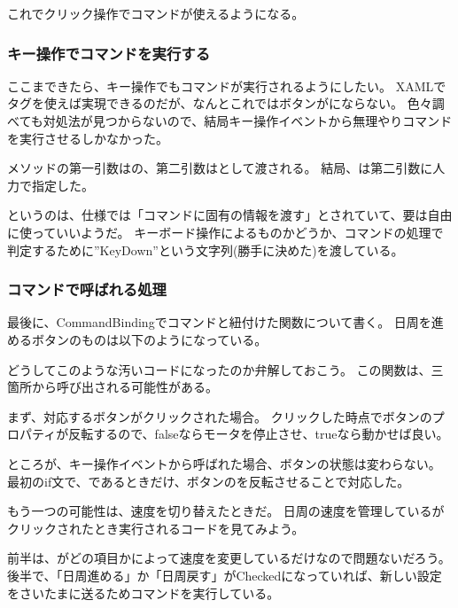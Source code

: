 \documentclass[letterpaper,10pt,dvipdfmx]{sphinxmanual}
\begin{document}
これでクリック操作でコマンドが使えるようになる。


\subsubsection{キー操作でコマンドを実行する}
\label{\detokenize{nissyu-idohen/pc-software-code:id11}}
ここまできたら、キー操作でもコマンドが実行されるようにしたい。
XAMLでタグを使えば実現できるのだが、なんとこれではボタンがにならない。
色々調べても対処法が見つからないので、結局キー操作イベントから無理やりコマンドを実行させるしかなかった。

メソッドの第一引数はの、第二引数はとして渡される。
結局、は第二引数に人力で指定した。

というのは、仕様では「コマンドに固有の情報を渡す」とされていて、要は自由に使っていいようだ。
キーボード操作によるものかどうか、コマンドの処理で判定するために''KeyDown''という文字列(勝手に決めた)を渡している。


\subsubsection{コマンドで呼ばれる処理}
\label{\detokenize{nissyu-idohen/pc-software-code:id12}}
最後に、CommandBindingでコマンドと紐付けた関数について書く。
日周を進めるボタンのものは以下のようになっている。

どうしてこのような汚いコードになったのか弁解しておこう。
この関数は、三箇所から呼び出される可能性がある。

まず、対応するボタンがクリックされた場合。
クリックした時点でボタンのプロパティが反転するので、falseならモータを停止させ、trueなら動かせば良い。

ところが、キー操作イベントから呼ばれた場合、ボタンの状態は変わらない。
最初のif文で、であるときだけ、ボタンのを反転させることで対応した。

もう一つの可能性は、速度を切り替えたときだ。
日周の速度を管理しているがクリックされたとき実行されるコードを見てみよう。

前半は、がどの項目かによって速度を変更しているだけなので問題ないだろう。
後半で、「日周進める」か「日周戻す」がCheckedになっていれば、新しい設定をさいたまに送るためコマンドを実行している。
\end{document}
